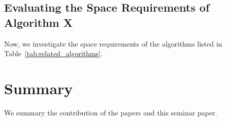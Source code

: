 \subsection{Evaluating the Space Requirements of Algorithm X}

Now, we investigate the space requirements of the algorithms listed in Table~\ref{tab:related_algorithms}.


\section{Summary}
We summary the contribution of the papers and this seminar paper.
